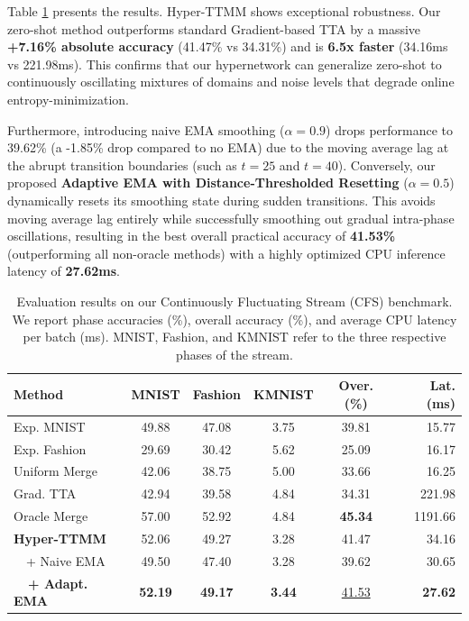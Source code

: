 \documentclass{article}
\theoremstyle{plain}
\theoremstyle{definition}
\theoremstyle{remark}
\begin{document}
Table \ref{tab:cfs_results} presents the results. Hyper-TTMM shows exceptional robustness. Our zero-shot method outperforms standard Gradient-based TTA by a massive \textbf{+7.16\% absolute accuracy} (41.47\% vs 34.31\%) and is \textbf{6.5x faster} (34.16ms vs 221.98ms). This confirms that our hypernetwork can generalize zero-shot to continuously oscillating mixtures of domains and noise levels that degrade online entropy-minimization.

Furthermore, introducing naive EMA smoothing ($\alpha=0.9$) drops performance to 39.62\% (a -1.85\% drop compared to no EMA) due to the moving average lag at the abrupt transition boundaries (such as $t=25$ and $t=40$). Conversely, our proposed \textbf{Adaptive EMA with Distance-Thresholded Resetting} ($\alpha=0.5$) dynamically resets its smoothing state during sudden transitions. This avoids moving average lag entirely while successfully smoothing out gradual intra-phase oscillations, resulting in the best overall practical accuracy of \textbf{41.53\%} (outperforming all non-oracle methods) with a highly optimized CPU inference latency of \textbf{27.62ms}.

\begin{table}[hbtp]
\caption{Evaluation results on our Continuously Fluctuating Stream (CFS) benchmark. We report phase accuracies (\%), overall accuracy (\%), and average CPU latency per batch (ms). MNIST, Fashion, and KMNIST refer to the three respective phases of the stream.}
\label{tab:cfs_results}
\vskip 0.15in
\begin{center}
\begin{scriptsize}
\begin{sc}
\setlength{\tabcolsep}{1.0pt}
\begin{tabular}{lccccr}
\toprule
Method & MNIST & Fashion & KMNIST & Over. (\%) & Lat. (ms) \\
\midrule
Exp. MNIST & 49.88 & 47.08 & 3.75 & 39.81 & 15.77 \\
Exp. Fashion & 29.69 & 30.42 & 5.62 & 25.09 & 16.17 \\
Uniform Merge & 42.06 & 38.75 & 5.00 & 33.66 & 16.25 \\
Grad. TTA & 42.94 & 39.58 & 4.84 & 34.31 & 221.98 \\
\midrule
Oracle Merge & 57.00 & 52.92 & 4.84 & \textbf{45.34} & 1191.66 \\
\textbf{Hyper-TTMM} & 52.06 & 49.27 & 3.28 & 41.47 & 34.16 \\
~~+ Naive EMA & 49.50 & 47.40 & 3.28 & 39.62 & 30.65 \\
\textbf{~~+ Adapt. EMA} & \textbf{52.19} & \textbf{49.17} & \textbf{3.44} & \underline{41.53} & \textbf{27.62} \\
\bottomrule
\end{tabular}
\end{sc}
\end{scriptsize}
\end{center}
\vskip -0.1in
\end{table}
\end{document}
